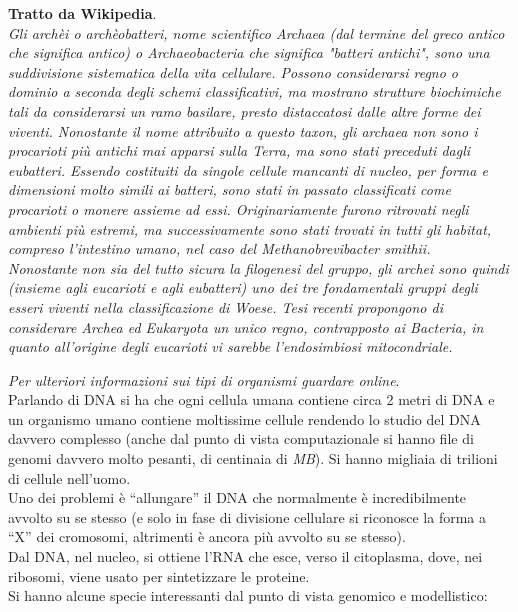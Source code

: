 \documentclass[a4paper,12pt, oneside]{book}
\begin{document}
\begin{shaded}
  \textbf{Tratto da Wikipedia}.\\
  \textit{Gli archèi o archèobatteri, nome scientifico Archaea (dal termine del
  greco antico che significa antico) o Archaeobacteria che significa "batteri
  antichi", sono 
  una suddivisione sistematica della vita cellulare. Possono considerarsi regno
  o dominio a seconda degli schemi classificativi, ma mostrano strutture
  biochimiche tali da considerarsi un ramo basilare, presto distaccatosi dalle
  altre forme dei viventi. Nonostante il nome attribuito a questo taxon, gli
  archaea non sono i procarioti più antichi mai apparsi sulla Terra, ma sono
  stati preceduti dagli eubatteri.
  Essendo costituiti da singole cellule mancanti di nucleo, per forma e
  dimensioni 
  molto simili ai batteri, sono stati in passato classificati come procarioti o
  monere assieme ad essi. Originariamente furono ritrovati negli ambienti più
  estremi, ma successivamente sono stati trovati in tutti gli habitat, compreso
  l'intestino umano, nel caso del Methanobrevibacter smithii.\\
  Nonostante non sia del tutto sicura la filogenesi del gruppo, gli archei sono
  quindi (insieme agli eucarioti e agli eubatteri) uno dei tre fondamentali
  gruppi degli esseri viventi nella classificazione di Woese. Tesi recenti
  propongono di considerare Archea ed Eukaryota un unico regno, contrapposto ai
  Bacteria, in quanto all'origine degli eucarioti vi sarebbe l'endosimbiosi
  mitocondriale.}  
\end{shaded}
\textit{Per ulteriori informazioni sui tipi di organismi guardare online}.\\
Parlando di DNA si ha che ogni cellula umana contiene circa 2 metri di DNA e un
organismo umano contiene moltissime cellule rendendo lo studio del DNA davvero
complesso (anche dal punto di vista computazionale si hanno file di genomi
davvero molto pesanti, di centinaia di \textit{MB}). Si hanno migliaia di
trilioni di cellule nell'uomo.\\
Uno dei problemi è ``allungare'' il DNA che normalmente è incredibilmente
avvolto su se stesso (e solo in fase di divisione cellulare si riconosce la
forma a ``X'' dei cromosomi, altrimenti è ancora più avvolto su se stesso). \\
Dal DNA, nel nucleo, si ottiene l'RNA che esce, verso il citoplasma, dove, nei
ribosomi, viene usato per sintetizzare le proteine.\\
Si hanno alcune specie interessanti dal punto di vista genomico e modellistico:
\end{document}
